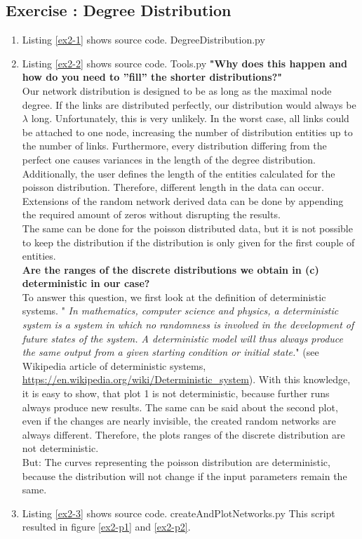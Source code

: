 \documentclass[10pt,a4paper]{article}
\newcommand{\exercise}[1]
{
  \stepcounter{subsection}
  \subsection*{Exercise \thesubsection: #1}

}
\begin{document}
\exercise{Degree Distribution}
\begin{enumerate}
\item Listing \ref{ex2-1} shows source code.
 {DegreeDistribution.py}

\item Listing \ref{ex2-2} shows source code.
 {Tools.py}
\textbf{{"}Why does this happen and how do you need to ”fill” the shorter distributions?{"}}\\
Our network distribution is designed to be as long as the maximal node degree. If the links are distributed perfectly, our distribution would always be $\lambda$ long. Unfortunately, this is very unlikely. In the worst case, all links could be attached to one node, increasing the number of distribution entities up to the number of links. Furthermore, every distribution differing from the perfect one causes variances in the length of the degree distribution.\\
Additionally, the user defines the length of the entities calculated for the poisson distribution. Therefore, different length in the data can occur.\\
Extensions of the random network derived data can be done by appending the required amount of zeros without disrupting the results.\\
The same can be done for the poisson distributed data, but it is not possible to keep the distribution if the distribution is only given for the first couple of entities.\\
\textbf{Are the ranges of the discrete distributions we obtain in (c) deterministic in our case?}\\
To answer this question, we first look at the definition of deterministic systems. {"}\textit{ In mathematics, computer science and physics, a deterministic system is a system in which no randomness is involved in the development of future states of the system. A deterministic model will thus always produce the same output from a given starting condition or initial state.}{"} (see Wikipedia article of deterministic systems, \url{https://en.wikipedia.org/wiki/Deterministic_system}). With this knowledge, it is easy to show, that plot 1 is not deterministic, because further runs always produce new results. The same can be said about the second plot, even if the changes are nearly invisible, the created random networks are always different. Therefore, the plots ranges of the discrete distribution are not deterministic.\\
But: The curves representing the poisson distribution are deterministic, because the distribution will not change if the input parameters remain the same.
\item Listing \ref{ex2-3} shows source code.
 {createAndPlotNetworks.py}
This script resulted in figure \ref{ex2-p1} and \ref{ex2-p2}.


\end{enumerate}
\end{document}
